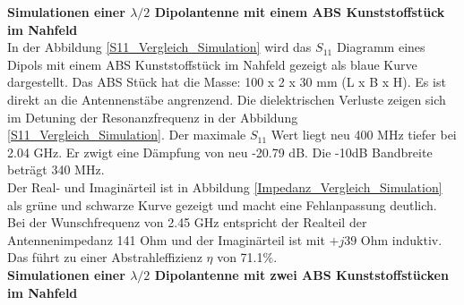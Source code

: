 \textbf{Simulationen einer $\lambda/2$ Dipolantenne mit einem ABS Kunststoffstück im Nahfeld}\\

In der Abbildung \ref{S11_Vergleich_Simulation} wird das $S_{11}$ Diagramm eines Dipols mit einem ABS Kunststoffstück im Nahfeld gezeigt als blaue Kurve dargestellt. Das ABS Stück hat die Masse: 100 x 2 x 30 mm (L x B x H). Es ist direkt an die Antennenstäbe angrenzend. Die dielektrischen Verluste zeigen sich im Detuning der Resonanzfrequenz in der Abbildung \ref{S11_Vergleich_Simulation}. Der maximale $S_{11}$ Wert liegt neu 400 MHz tiefer bei 2.04 GHz. Er zwigt eine Dämpfung von neu -20.79 dB. Die -10dB Bandbreite beträgt 340 MHz.\\

Der Real- und Imaginärteil ist in  Abbildung \ref{Impedanz_Vergleich_Simulation} als grüne und schwarze Kurve gezeigt und macht eine Fehlanpassung deutlich. Bei der Wunschfrequenz von 2.45 GHz entspricht der Realteil der Antennenimpedanz 141 Ohm und der Imaginärteil ist mit $+j39$ Ohm induktiv. Das führt zu einer Abstrahleffizienz $\eta$ von 71.1$\%$.\\
\textbf{Simulationen einer $\lambda/2$ Dipolantenne mit zwei ABS Kunststoffstücken im Nahfeld}\\

